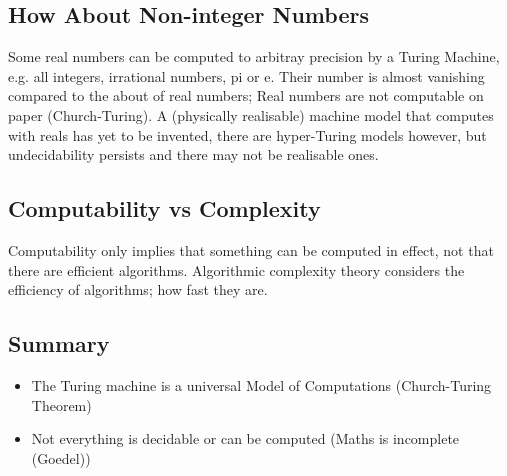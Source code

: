 \subsection{How About Non-integer Numbers}
Some real numbers can be computed to arbitray precision by a Turing Machine, e.g. all integers, irrational numbers, pi or e. Their number is almost vanishing compared to the about of real numbers; Real numbers are not computable on paper (Church-Turing). A (physically realisable) machine model that computes with reals has yet to be invented, there are hyper-Turing models however, but undecidability persists and there may not be realisable ones.
\subsection{Computability vs Complexity}
Computability only implies that something can be computed in effect, not that there are efficient algorithms. Algorithmic complexity theory considers the efficiency of algorithms; how fast they are.
\subsection{Summary}
\begin{itemize}
    \item The Turing machine is a universal Model of Computations (Church-Turing Theorem)
    \item Not everything is decidable or can be computed (Maths is incomplete (Goedel))    
\end{itemize}
